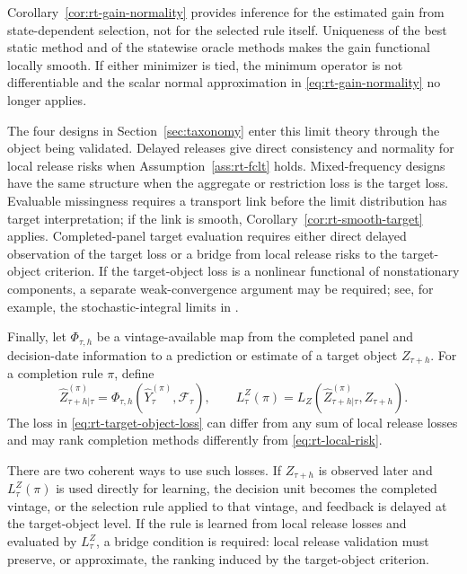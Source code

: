 \documentclass[a4paper, 12pt]{article}
\theoremstyle{plain}
\theoremstyle{remark}
\newcommand{\Fcal}{\mathcal{F}}
\newcommand{\1}{\mathbf{1}}
\begin{document}
Corollary~\ref{cor:rt-gain-normality} provides inference for the estimated gain from state-dependent selection, not for the selected rule itself. Uniqueness of the best static method and of the statewise oracle methods makes the gain functional locally smooth. If either minimizer is tied, the minimum operator is not differentiable and the scalar normal approximation in \eqref{eq:rt-gain-normality} no longer applies.

The four designs in Section~\ref{sec:taxonomy} enter this limit theory through the object being validated. Delayed releases give direct consistency and normality for local release risks when Assumption~\ref{ass:rt-fclt} holds. Mixed-frequency designs have the same structure when the aggregate or restriction loss is the target loss. Evaluable missingness requires a transport link before the limit distribution has target interpretation; if the link is smooth, Corollary~\ref{cor:rt-smooth-target} applies. Completed-panel target evaluation requires either direct delayed observation of the target loss or a bridge from local release risks to the target-object criterion. If the target-object loss is a nonlinear functional of nonstationary components, a separate weak-convergence argument may be required; see, for example, the stochastic-integral limits in \citet{LiangPhillipsWangWang2016}.

Finally, let \(\Phi_{\tau,h}\) be a vintage-available map from the completed panel and decision-date information to a prediction or estimate of a target object \(Z_{\tau+h}\). For a completion rule \(\pi\), define
\begin{equation}
\label{eq:rt-target-object-loss}
    \widehat Z^{(\pi)}_{\tau+h|\tau}
    =
    \Phi_{\tau,h}\!\left(\widehat Y^{(\pi)}_\tau,\Fcal_\tau\right),
    \qquad
    L^Z_\tau(\pi)
    =
    L_Z\!\left(\widehat Z^{(\pi)}_{\tau+h|\tau},Z_{\tau+h}\right) .
\end{equation}
The loss in \eqref{eq:rt-target-object-loss} can differ from any sum of local release losses and may rank completion methods differently from \eqref{eq:rt-local-risk}.

There are two coherent ways to use such losses. If \(Z_{\tau+h}\) is observed later and \(L^Z_\tau(\pi)\) is used directly for learning, the decision unit becomes the completed vintage, or the selection rule applied to that vintage, and feedback is delayed at the target-object level. If the rule is learned from local release losses and evaluated by \(L^Z_\tau\), a bridge condition is required: local release validation must preserve, or approximate, the ranking induced by the target-object criterion.
\end{document}
